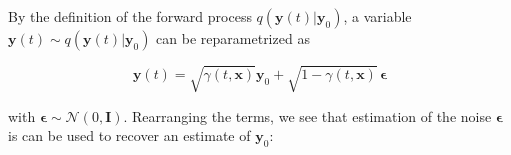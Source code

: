 



By the definition of the forward process $q(\mathbf{y}(t) \lvert \mathbf{y}_{0})$, a variable $\mathbf{y}(t) \sim q(\mathbf{y}(t) \lvert \mathbf{y}_{0})$ can be reparametrized as 

\begin{equation*}
\mathbf{y}(t) = \sqrt{\gamma(t, \mathbf{x})}\mathbf{y}_{0} + \sqrt{1-\gamma(t, \mathbf{x})} \, \boldsymbol{\epsilon}
\end{equation*}

with $\boldsymbol{\epsilon} \sim \mathcal{N}(0, \mathbf{I})$. Rearranging the terms, we see that estimation of the noise $\boldsymbol{\epsilon}$ is can be used to recover an estimate of $\mathbf{y}_{0}$:

